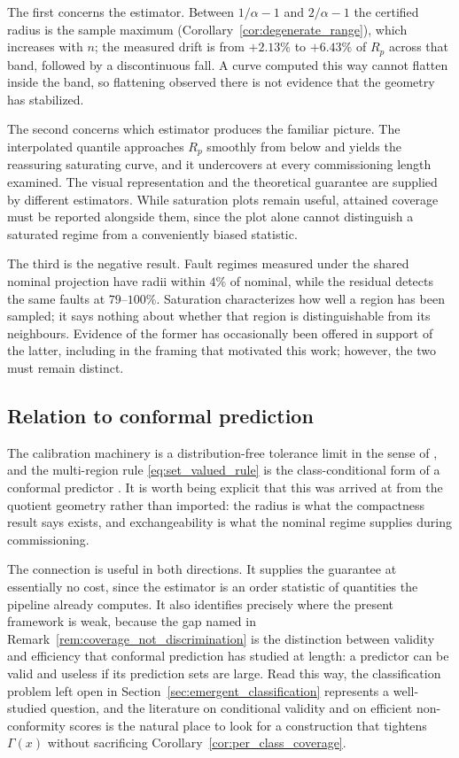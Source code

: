 \documentclass[a4paper]{cas-sc}
\begin{document}
The first concerns the estimator. Between \(1/\alpha-1\) and \(2/\alpha-1\)
the certified radius is the sample maximum
(Corollary~\ref{cor:degenerate_range}), which increases with \(n\); the
measured drift is from \(+2.13\%\) to \(+6.43\%\) of \(R_p\) across that band,
followed by a discontinuous fall. A curve computed this way cannot flatten
inside the band, so flattening observed there is not evidence that the
geometry has stabilized.

The second concerns which estimator produces the familiar picture. The
interpolated quantile approaches \(R_p\) smoothly from below and yields the
reassuring saturating curve, and it undercovers at every commissioning length
examined. The visual representation and the theoretical guarantee are supplied by different estimators.
While saturation plots remain useful, attained coverage must be reported
alongside them, since the plot alone cannot distinguish a
saturated regime from a conveniently biased statistic.

The third is the negative result. Fault regimes measured under the shared
nominal projection have radii within \(4\%\) of nominal, while the residual
detects the same faults at \(79\)--\(100\%\). Saturation characterizes how well
a region has been sampled; it says nothing about whether that region is
distinguishable from its neighbours. Evidence of the former has occasionally
been offered in support of the latter, including in the framing that motivated
this work; however, the two must remain distinct.

\subsection{Relation to conformal prediction}
\label{subsec:disc_conformal}

The calibration machinery is a distribution-free tolerance limit in the sense
of \citet{wilks1941}, and the multi-region rule
\eqref{eq:set_valued_rule} is the class-conditional form of a conformal
predictor \citep{vovk2005,shafer2008}. It is worth being explicit that this
was arrived at from the quotient geometry rather than imported: the radius is
what the compactness result says exists, and exchangeability is what the
nominal regime supplies during commissioning.

The connection is useful in both directions. It supplies the guarantee at
essentially no cost, since the estimator is an order statistic of quantities
the pipeline already computes. It also identifies precisely where the present
framework is weak, because the gap named in
Remark~\ref{rem:coverage_not_discrimination} is the distinction between
validity and efficiency that conformal prediction has studied at length: a
predictor can be valid and useless if its prediction sets are large. Read this
way, the classification problem left open in
Section~\ref{sec:emergent_classification} represents a well-studied question,
and the literature on conditional validity and on efficient
non-conformity scores is the natural place to look for a construction that
tightens \(\Gamma(x)\) without sacrificing
Corollary~\ref{cor:per_class_coverage}.
\end{document}
